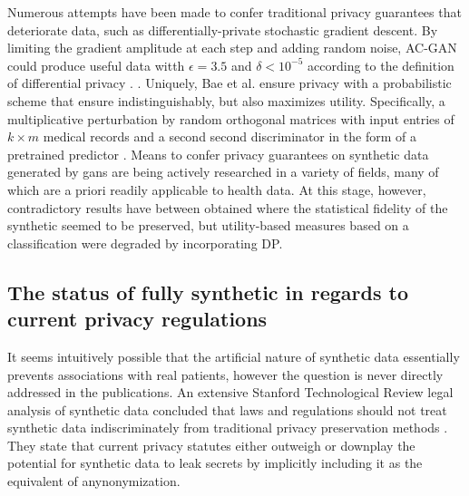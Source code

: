 Numerous attempts have been made to confer traditional privacy guarantees that deteriorate data, such as differentially-private stochastic gradient descent. By limiting the gradient amplitude at each step and adding random noise, AC-GAN could produce useful data witth $\epsilon=3.5$ and $\delta<10^{-5}$ according to the definition of differential privacy \cite{Beaulieu-Jones2019-ct, esteban2017real,chincheong2020generation}. \cite{BaeAnomiGAN2020}. Uniquely, Bae et al. ensure privacy with a probabilistic scheme that ensure indistinguishably, but also maximizes utility. Specifically, a multiplicative perturbation by random orthogonal matrices with input entries of $k × m$ medical records and a second second discriminator in the form of a pretrained  predictor \cite{Bae2020}. Means to confer privacy guarantees on synthetic data generated by \glspl{gan} are being actively researched in a variety of fields, many of which are a priori readily applicable to health data. At this stage, however, contradictory results have between obtained where the statistical fidelity of the synthetic seemed to be preserved, but utility-based measures based on a classification were degraded by incorporating DP.\par
\subsection{The status of fully synthetic in regards to current privacy regulations}
It seems intuitively possible that the artificial nature of synthetic data essentially prevents associations with real patients, however the question is never directly addressed in the publications. An extensive Stanford Technological Review legal analysis of synthetic data concluded that laws and regulations should not treat synthetic data indiscriminately from traditional privacy preservation methods \cite{bellovin2019privacy}. They state that current privacy statutes either outweigh or downplay the potential for synthetic data to leak secrets by implicitly including it as the equivalent of anynonymization. 
